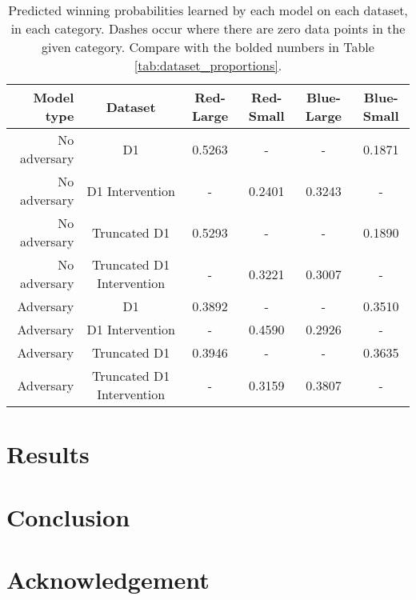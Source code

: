 \documentclass{article}
\begin{document}
\begin{table*} %
\centering
\begin{tabular}{r | c | c | c | c | c}
 Model type & Dataset & Red-Large & Red-Small & Blue-Large & Blue-Small \\
 \hline
No adversary & D1 & 0.5263 & - & - & 0.1871 \\
No adversary  & D1 Intervention & - & 0.2401 & 0.3243 & - \\
No adversary  & Truncated D1 & 0.5293 & - & - & 0.1890 \\
No adversary  & Truncated D1 Intervention & - & 0.3221 & 0.3007 & - \\
\hline
Adversary & D1 & 0.3892 & - & - & 0.3510 \\
Adversary  & D1 Intervention & - & 0.4590 & 0.2926 & - \\
Adversary  & Truncated D1 & 0.3946 & - & - & 0.3635 \\
Adversary  & Truncated D1 Intervention & - & 0.3159 & 0.3807 & -
\end{tabular}
\caption{Predicted winning probabilities learned by each model on each dataset, in each category. Dashes occur where there are zero data points in the given category. Compare with the bolded numbers in Table \ref{tab:dataset_proportions}.}
\label{tab:model_performance}
\end{table*}



\section{Results}










\section{Conclusion}









\section{Acknowledgement}














\end{document}
